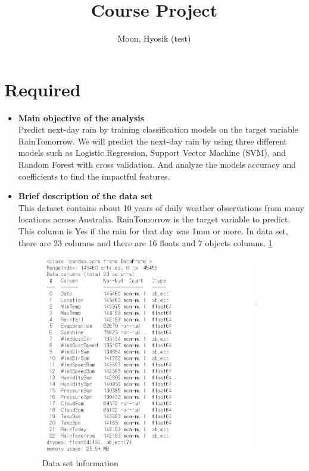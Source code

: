 \documentclass[12pt]{article}
\title{Course Project}
\author{
  Moon, Hyosik (test)
  }
\begin{document}
\maketitle

\section{Required}

\begin{itemize}
\item \textbf{Main objective of the analysis} \\
Predict next-day rain by training classification models on the target variable RainTomorrow. We will predict the next-day rain by using three different models such as Logistic Regression, Support Vector Machine (SVM), and Random Forest with cross validation. And analyze the models accuracy and coefficients to find the impactful features.

\item \textbf{Brief description of the data set} \\
This dataset contains about 10 years of daily weather observations from many locations across Australia. RainTomorrow is the target variable to predict. This column is Yes if the rain for that day was 1mm or more. In data set, there are 23 columns and there are 16 floats and 7 objects columns. \ref{data_info}

\begin{figure}[H]
    \centering
    \includegraphics[width=0.9\textwidth]{figures/data_info.png}
    \caption{Data set information}\label{data_info}
\end{figure}


\end{itemize}
\end{document}
